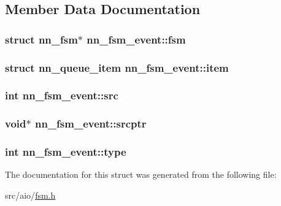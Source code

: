 \subsection{Member Data Documentation}
\subsubsection[{fsm}]{\setlength{\rightskip}{0pt plus 5cm}struct {\bf nn\+\_\+fsm}$\ast$ nn\+\_\+fsm\+\_\+event\+::fsm}\hypertarget{structnn__fsm__event_a37e7bb55e85b8c65d08d2c71a5889480}{}\label{structnn__fsm__event_a37e7bb55e85b8c65d08d2c71a5889480}
\subsubsection[{item}]{\setlength{\rightskip}{0pt plus 5cm}struct {\bf nn\+\_\+queue\+\_\+item} nn\+\_\+fsm\+\_\+event\+::item}\hypertarget{structnn__fsm__event_a4f93f7f20c2c966032cbd04b6dc8c49c}{}\label{structnn__fsm__event_a4f93f7f20c2c966032cbd04b6dc8c49c}
\subsubsection[{src}]{\setlength{\rightskip}{0pt plus 5cm}int nn\+\_\+fsm\+\_\+event\+::src}\hypertarget{structnn__fsm__event_a6ab6ed4117004772f0b0b1b489365701}{}\label{structnn__fsm__event_a6ab6ed4117004772f0b0b1b489365701}
\subsubsection[{srcptr}]{\setlength{\rightskip}{0pt plus 5cm}void$\ast$ nn\+\_\+fsm\+\_\+event\+::srcptr}\hypertarget{structnn__fsm__event_a3216092753f9eb40385314e622d45350}{}\label{structnn__fsm__event_a3216092753f9eb40385314e622d45350}
\subsubsection[{type}]{\setlength{\rightskip}{0pt plus 5cm}int nn\+\_\+fsm\+\_\+event\+::type}\hypertarget{structnn__fsm__event_a9836f4659e72960e8959e3d14e2a7196}{}\label{structnn__fsm__event_a9836f4659e72960e8959e3d14e2a7196}


The documentation for this struct was generated from the following file\+:\begin{DoxyCompactItemize}
\item 
src/aio/\hyperlink{fsm_8h}{fsm.\+h}\end{DoxyCompactItemize}

